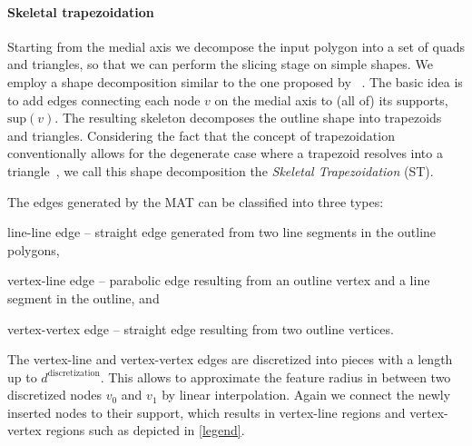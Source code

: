 \paragraph{Skeletal trapezoidation}
Starting from the medial axis we decompose the input polygon into a set of quads and triangles, so that we can perform the slicing stage on simple shapes.
We employ a shape decomposition similar to the one proposed by \citeauthor{Ding2016a}~\cite{Ding2016a}. 
The basic idea is to add edges connecting each node $v$ on the medial axis to (all of) its supports, $\text{sup}(v)$. 
The resulting skeleton decomposes the outline shape into trapezoids and triangles.
Considering the fact that the concept of trapezoidation conventionally allows for the degenerate case where a trapezoid resolves into a triangle~\cite{chazelle1984,fournier1984}, we call this shape decomposition the \emph{Skeletal Trapezoidation} (ST).


The edges generated by the MAT can be classified into three types:
\begin{enumerate*}
\item line-line edge -- straight edge generated from two line segments in the outline polygons,
\item vertex-line edge -- parabolic edge resulting from an outline vertex and a line segment in the outline, and 
\item vertex-vertex edge -- straight edge resulting from two outline vertices.
\end{enumerate*}
The vertex-line and vertex-vertex edges are discretized into pieces with a length up to $d^\text{discretization}$.
This allows to approximate the feature radius in between two discretized nodes $v_0$ and $v_1$ by linear interpolation. 
Again we connect the newly inserted nodes to their support, which results in vertex-line regions and vertex-vertex regions such as depicted in \cref{legend}.





